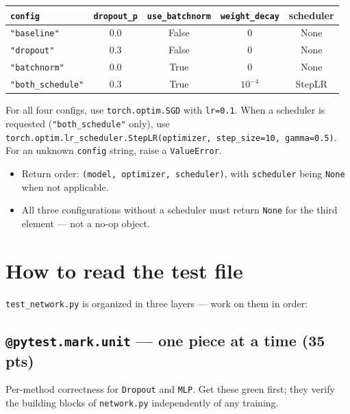\documentclass[11pt]{article}
\newcommand{\code}[1]{\texttt{\small #1}}
\begin{document}
\begin{center}
\begin{tabular}{lcccc}
\code{config}  & \code{dropout\_p} & \code{use\_batchnorm} & \code{weight\_decay} & scheduler \\
\hline
\code{"baseline"}      & 0.0 & False & 0       & None \\
\code{"dropout"}       & 0.3 & False & 0       & None \\
\code{"batchnorm"}     & 0.0 & True  & 0       & None \\
\code{"both\_schedule"} & 0.3 & True  & $10^{-4}$ & StepLR \\
\end{tabular}
\end{center}

\medskip\noindent
For all four configs, use \code{torch.optim.SGD} with \code{lr=0.1}. When a
scheduler is requested (\code{"both\_schedule"} only), use
\code{torch.optim.lr\_scheduler.StepLR(optimizer, step\_size=10, gamma=0.5)}.
For an unknown \code{config} string, raise a \code{ValueError}.

\begin{itemize}
    \item Return order: \code{(model, optimizer, scheduler)}, with
          \code{scheduler} being \code{None} when not applicable.
    \item All three configurations without a scheduler must return
          \code{None} for the third element --- not a no-op object.
\end{itemize}

\section{How to read the test file}

\code{test\_network.py} is organized in three layers --- work on them in order:

\subsection*{\texttt{@pytest.mark.unit} --- one piece at a time (35 pts)}

Per-method correctness for \code{Dropout} and \code{MLP}. Get these green
first; they verify the building blocks of \code{network.py} independently
of any training.
\end{document}
